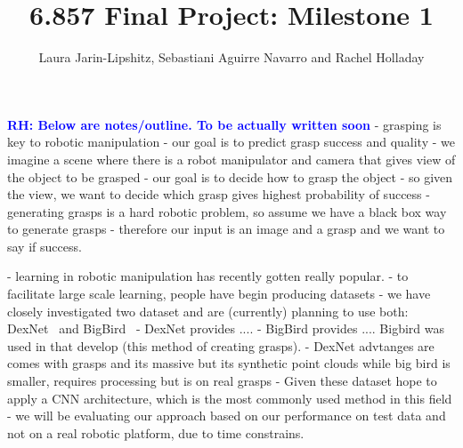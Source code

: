 \documentclass[letterpaper, 10 pt]{article}
\newcommand{\rhnote}[1]{\ifthenelse{\boolean{include-notes}}%
 {\textcolor{blue}{\textbf{RH: #1}}}{}}
\begin{document}
\title{6.857 Final Project: Milestone 1}
\author{Laura Jarin-Lipshitz, Sebastiani Aguirre Navarro and Rachel Holladay}
\maketitle

\rhnote{Below are notes/outline. To be actually written soon}
- grasping is key to robotic manipulation
- our goal is to predict grasp success and quality
- we imagine a scene where there is a robot manipulator and camera that gives view of the object to be grasped
- our goal is to decide how to grasp the object
- so given the view, we want to decide which grasp gives highest probability of success
- generating grasps is a hard robotic problem, so assume we have a black box way to generate grasps
- therefore our input is an image and a grasp and we want to say if success. 

- learning in robotic manipulation has recently gotten really popular. 
- to facilitate large scale learning, people have begin producing datasets
- we have closely investigated two dataset and are (currently) planning to use both: DexNet~\cite{mahler2017dex} and BigBird~\cite{singh2014bigbird}
- DexNet provides ....
- BigBird provides .... Bigbird was used in \cite{pas2017grasp} that develop (this method of creating grasps). 
- DexNet advtanges are comes with grasps and its massive but its synthetic point clouds while big bird is smaller, requires processing but is on real grasps
- Given these dataset hope to apply a CNN architecture, which is the most commonly used method in this field
- we will be evaluating our approach based on our performance on test data and not on a real robotic platform, due to time constrains. 



{\footnotesize
    
}
\end{document}
